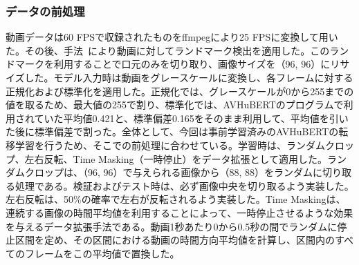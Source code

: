 \documentclass[12pt]{jarticle}
\numberwithin{equation}{section}    %
\numberwithin{figure}{section}      %
\numberwithin{table}{section}      %
\begin{document}
\begin{table}[bt]
    \centering
    \caption{利用したデータセットの文章数}
    \label{sec4:tab:dataset_info}
    \begin{center}
        \renewcommand{\arraystretch}{0.9} %
        \setlength{\tabcolsep}{8pt}      %
    \end{center}
\end{table}

\subsubsection{データの前処理}
動画データは60 FPSで収録されたものをffmpegにより25 FPSに変換して用いた。その後、手法~\cite{bulat2017far}により動画に対してランドマーク検出を適用した。このランドマークを利用することで口元のみを切り取り、画像サイズを（96, 96）にリサイズした。モデル入力時は動画をグレースケールに変換し、各フレームに対する正規化および標準化を適用した。正規化では、グレースケールが0から255までの値を取るため、最大値の255で割り、標準化では、AVHuBERTのプログラムで利用されていた平均値0.421と、標準偏差0.165をそのまま利用して、平均値を引いた後に標準偏差で割った。全体として、今回は事前学習済みのAVHuBERTの転移学習を行うため、そこでの前処理に合わせている。学習時は、ランダムクロップ、左右反転、Time Masking（一時停止）をデータ拡張として適用した。ランダムクロップは、（96, 96）で与えられる画像から（88, 88）をランダムに切り取る処理である。検証およびテスト時は、必ず画像中央を切り取るよう実装した。左右反転は、50\%の確率で左右が反転されるよう実装した。Time Maskingは、連続する画像の時間平均値を利用することによって、一時停止させるような効果を与えるデータ拡張手法である。動画1秒あたり0から0.5秒の間でランダムに停止区間を定め、その区間における動画の時間方向平均値を計算し、区間内のすべてのフレームをこの平均値で置換した。
\end{document}
